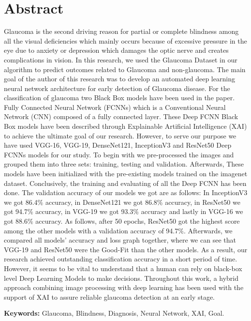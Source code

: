 \section*{Abstract}
Glaucoma is the second driving reason for partial or complete blindness among all the visual deficiencies which mainly occurs because of excessive pressure in the eye due to anxiety or depression which damages the optic nerve and creates complications in vision. In this research, we used the Glaucoma Dataset in our algorithm to predict outcomes related to Glaucoma and non-glaucoma. The main goal of the author of this research was to develop an automated deep learning neural network architecture for early detection of Glaucoma disease. For the classification of glaucoma two Black Box models have been used in the paper. Fully Connected Neural Network (FCNNs) which is a Conventional Neural Network (CNN) composed of a fully connected layer. These Deep FCNN Black Box models have been described through Explainable Artificial Intelligence (XAI) to achieve the ultimate goal of our research. However, to serve our purpose we have used VGG-16, VGG-19, DenseNet121, InceptionV3 and ResNet50 Deep FCNNs models for our study. To begin with we pre-processed the images and grouped them into three sets: training, testing and validation. Afterwards, These models have been initialized with the pre-existing models trained on the imagenet dataset. Conclusively, the training and evaluating of all the Deep FCNN has been done. The validation accuracy of our models we got are as follows: In InceptionV3 we got 86.4\% accuracy, in DenseNet121 we got 86.8\% accuracy, in ResNet50 we got 94.7\% accuracy, in VGG-19 we got 93.3\% accuracy and lastly in VGG-16 we got 88.6\% accuracy. As follows, after 50 epochs,  ResNet50 got the highest score among the other models with a validation accuracy of 94.7\%. Afterwards, we compared all models' accuracy and loss graph together, where we can see that VGG-19 and ResNet50 were the Good-Fit than the other models. As a result, our research achieved outstanding classification accuracy in a short period of time. However, it seems to be vital to understand that a human can rely on black-box level Deep Learning Models to make decisions. Throughout this work, a hybrid approach combining image processing with deep learning has been used with the support of  XAI to assure reliable glaucoma detection at an early stage.

\vspace{1cm}
\noindent \textbf{Keywords:} Glaucoma, Blindness, Diagnosis, Neural Network, XAI, Goal.
\pagebreak
